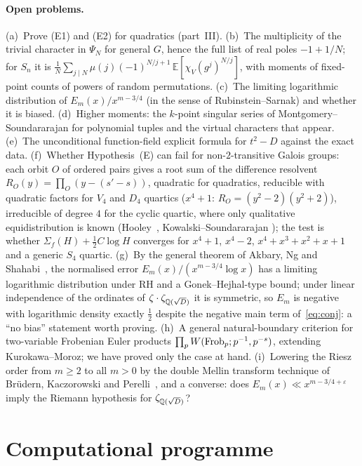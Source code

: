 \documentclass[11pt,a4paper]{article}
\theoremstyle{remark}\newtheorem{remark}[theorem]{Remark}
\begin{document}
\paragraph{Open problems.} (a)~Prove (E1) and (E2) for quadratics (part~III). (b)~The multiplicity of the
trivial character in $\Psi_N$ for general $G$, hence the full list of real poles $-1+1/N$; for $S_n$ it is
$\tfrac1N\sum_{j\mid N}\mu(j)(-1)^{N/j+1}\,\mathbb E[\chi_V(g^j)^{N/j}]$, with moments of fixed-point counts of powers
of random permutations. (c)~The limiting logarithmic distribution of $E_m(x)/x^{m-3/4}$ (in the sense of
Rubinstein--Sarnak) and whether it is biased. (d)~Higher moments: the $k$-point singular series of
Montgomery--Soundararajan for polynomial tuples and the virtual characters that appear. (e)~The unconditional
function-field explicit formula for $t^2-D$ against the exact data. (f)~Whether Hypothesis~(E) can fail for
non-$2$-transitive Galois groups: each orbit $O$ of ordered pairs gives a root sum of the difference resolvent
$R_O(y)=\prod_O(y-(s'-s))$, quadratic for quadratics, reducible with quadratic factors for $V_4$ and $D_4$
quartics ($x^4+1$: $R_O=(y^2-2)(y^2+2)$), irreducible of degree $4$ for the cyclic quartic, where only
qualitative equidistribution is known (Hooley~\cite{Hooley1964}, Kowalski--Soundararajan
\cite{KowalskiSoundararajan2021}); the test is whether $\Sigma_f(H)+\tfrac12C\log H$ converges for
$x^4+1$, $x^4-2$, $x^4+x^3+x^2+x+1$ and a generic $S_4$ quartic. (g)~By the general theorem of Akbary, Ng and
Shahabi~\cite{AkbaryNgShahabi2014}, the normalised error $E_m(x)/(x^{m-3/4}\log x)$ has a limiting logarithmic
distribution under RH and a Gonek--Hejhal-type bound; under linear independence of the ordinates of
$\zeta\cdot\zeta_{\mathbb{Q}(\sqrt D)}$ it is symmetric, so $E_m$ is negative with logarithmic density exactly $\tfrac12$
despite the negative main term of~\eqref{eq:conj}: a ``no bias'' statement worth proving. (h)~A general natural-boundary
criterion for two-variable Frobenian Euler products $\prod_pW(\operatorname{Frob}_p;p^{-1},p^{-s})$, extending
Kurokawa--Moroz; we have proved only the case at hand. (i)~Lowering the
Riesz order from $m\ge2$ to all $m>0$ by the double Mellin transform technique of Br\"udern, Kaczorowski and
Perelli~\cite{BrudernKaczorowskiPerelli2019}, and a converse: does $E_m(x)\ll x^{m-3/4+\varepsilon}$ imply the
Riemann hypothesis for $\zeta_{\mathbb{Q}(\sqrt D)}$?

\appendix
\section{Computational programme}\label{app:comp}
\end{document}
